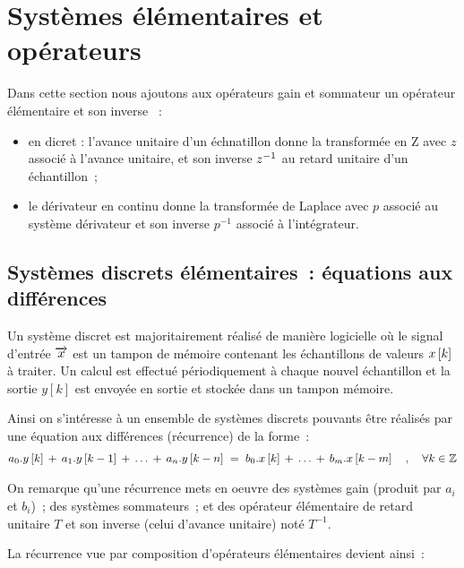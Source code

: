 \section{Systèmes élémentaires et opérateurs}
\def\d0{\vec{\delta_0}}

Dans cette section nous ajoutons aux opérateurs gain et sommateur un
opérateur élémentaire et son inverse ~:
\begin{itemize}
\item en dicret : l'avance unitaire d'un échnatillon donne la
  transformée en Z avec $z$ associé à l'avance unitaire, et son inverse $z^{-1}$ au retard unitaire d'un échantillon~;
\item le dérivateur en continu donne la transformée de Laplace avec $p$ associé au système dérivateur et son inverse $p^{-1}$ associé à l'intégrateur.
\end{itemize}

\subsection{Systèmes discrets élémentaires~: équations aux différences}
Un système discret est majoritairement réalisé de manière logicielle
où le signal d'entrée $\overrightarrow{x}$ est un tampon de mémoire contenant les
échantillons de valeurs $x\left[k\right]$ à traiter. Un calcul est effectué
périodiquement à chaque nouvel échantillon et la sortie $y[k]$ est
envoyée en sortie et stockée dans un tampon mémoire.

Ainsi on s'intéresse à un ensemble de systèmes discrets pouvants être
réalisés par une équation aux différences (récurrence) de la forme~:
\begin{eqnarray}
  \label{eq:systeme_recurrence}
   a_0.y\left[k\right] \,+\,  a_1.y\left[k-1\right] \,+\,  \dots \,+\, a_n.y\left[k-n\right]     \;=\;  b_0.x\left[k\right] \,+\, \dots \,+\,b_m.x\left[k-m\right]  \quad,\quad \forall k\in\mathbb{Z}
\end{eqnarray}


On remarque qu'une récurrence mets en oeuvre des systèmes gain
(produit par $a_i$ et $b_i$)~; des systèmes sommateurs~; et des
opérateur élémentaire de retard unitaire $T$ et son inverse (celui
d'avance unitaire) noté $T^{-1}$.

La récurrence vue par composition d'opérateurs élémentaires devient ainsi~:

